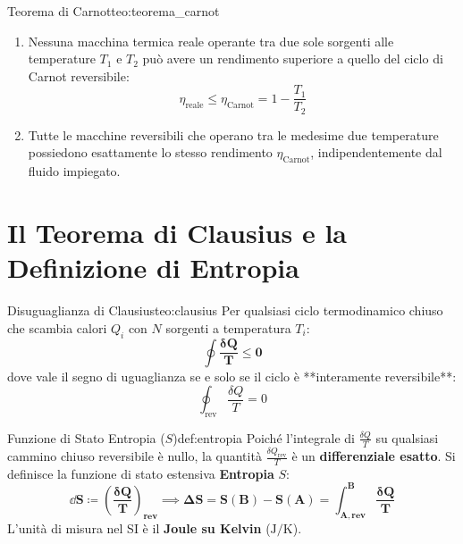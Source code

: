 \begin{teorema}{Teorema di Carnot}{teo:teorema_carnot}
\begin{enumerate}
    \item Nessuna macchina termica reale operante tra due sole sorgenti alle temperature $T_1$ e $T_2$ può avere un rendimento superiore a quello del ciclo di Carnot reversibile:
    \begin{equation}
        \eta_{\text{reale}} \le \eta_{\text{Carnot}} = 1 - \frac{T_1}{T_2}
    \end{equation}
    \item Tutte le macchine reversibili che operano tra le medesime due temperature possiedono esattamente lo stesso rendimento $\eta_{\text{Carnot}}$, indipendentemente dal fluido impiegato.
\end{enumerate}
\end{teorema}

\section{Il Teorema di Clausius e la Definizione di Entropia}
\label{sec:clausius_entropia}

\begin{teorema}{Disuguaglianza di Clausius}{teo:clausius}
Per qualsiasi ciclo termodinamico chiuso che scambia calori $Q_i$ con $N$ sorgenti a temperatura $T_i$:
\begin{equation}
    \mathbf{\oint \frac{\delta Q}{T} \le 0}
    \label{eq:disuguaglianza_clausius}
\end{equation}
dove vale il segno di uguaglianza se e solo se il ciclo è **interamente reversibile**:
\begin{equation}
    \oint_{\text{rev}} \frac{\delta Q}{T} = 0
    \label{eq:clausius_rev}
\end{equation}
\end{teorema}

\begin{definizione}{Funzione di Stato Entropia ($S$)}{def:entropia}
Poiché l'integrale di $\frac{\delta Q}{T}$ su qualsiasi cammino chiuso reversibile è nullo, la quantità $\frac{\delta Q_{\text{rev}}}{T}$ è un \textbf{differenziale esatto}. Si definisce la funzione di stato estensiva \textbf{Entropia} $S$:
\begin{equation}
    \mathbf{\dd S \coloneqq \left(\frac{\delta Q}{T}\right)_{\text{rev}} \implies \Delta S = S(B) - S(A) = \int_{A,\text{rev}}^B \frac{\delta Q}{T}}
    \label{eq:entropia_def}
\end{equation}
L'unità di misura nel SI è il \textbf{Joule su Kelvin} ($\si{\joule\per\kelvin}$).
\end{definizione}

